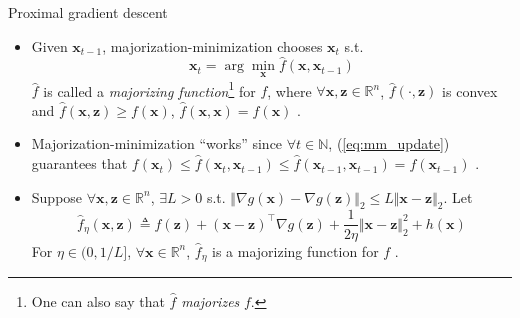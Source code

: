 \documentclass{beamer}
\numberwithin{equation}{section}
\newcommand{\aref}[1]{\alert{\ref{#1}}}
\begin{document}
\begin{frame}{Proximal gradient descent}
    \begin{itemize}
        \item
        Given $ \mathbf{x}_{t - 1} $, majorization-minimization chooses
        $ \mathbf{x}_t $ s.t. \cite{prox_algos}
        \begin{equation} \label{eq:mm_update}
            \mathbf{x}_t = \arg\min_\mathbf{x}\hat{f}(\mathbf{x},
            \mathbf{x}_{t - 1})
        \end{equation}
        $ \hat{f} $ is called a \textit{majorizing function}\footnote{
            One can also say that $ \hat{f} $ \textit{majorizes} $ f $.
        } for $ f $, where $ \forall \mathbf{x}, \mathbf{z} \in \mathbb{R}^n $,
        $ \hat{f}(\cdot, \mathbf{z}) $ is convex and
        $ \hat{f}(\mathbf{x}, \mathbf{z}) \ge f(\mathbf{x}) $,
        $ \hat{f}(\mathbf{x}, \mathbf{x}) = f(\mathbf{x}) $ \cite{prox_algos}.

        \item
        Majorization-minimization ``works'' since $ \forall t \in \mathbb{N} $,
        (\aref{eq:mm_update}) guarantees that $ f(\mathbf{x}_t) \le
        \hat{f}(\mathbf{x}_t, \mathbf{x}_{t - 1}) \le
        \hat{f}(\mathbf{x}_{t - 1}, \mathbf{x}_{t - 1}) =
        f(\mathbf{x}_{t - 1}) $ \cite{stat_learn_sparsity}.

        \item
        Suppose $ \forall \mathbf{x}, \mathbf{z} \in \mathbb{R}^n $,
        $ \exists L > 0 $ s.t. $ \Vert\nabla g(\mathbf{x}) -
        \nabla g(\mathbf{z})\Vert_2 \le L\Vert\mathbf{x} -
        \mathbf{z}\Vert_2 $. Let
        \begin{equation} \label{eq:prox_grad_mm_func}
            \hat{f}_\eta(\mathbf{x}, \mathbf{z}) \triangleq f(\mathbf{z}) +
            (\mathbf{x} - \mathbf{z})^\top\nabla g(\mathbf{z}) +
            \frac{1}{2\eta}\Vert\mathbf{x} - \mathbf{z}\Vert_2^2 +
            h(\mathbf{x})
        \end{equation}
        For $ \eta \in (0, 1 / L] $, $ \forall \mathbf{x} \in \mathbb{R}^n $,
        $ \hat{f}_\eta $ is a majorizing function for $ f $ \cite{prox_algos}.
    \end{itemize}

    \medskip
\end{frame}
\end{document}
